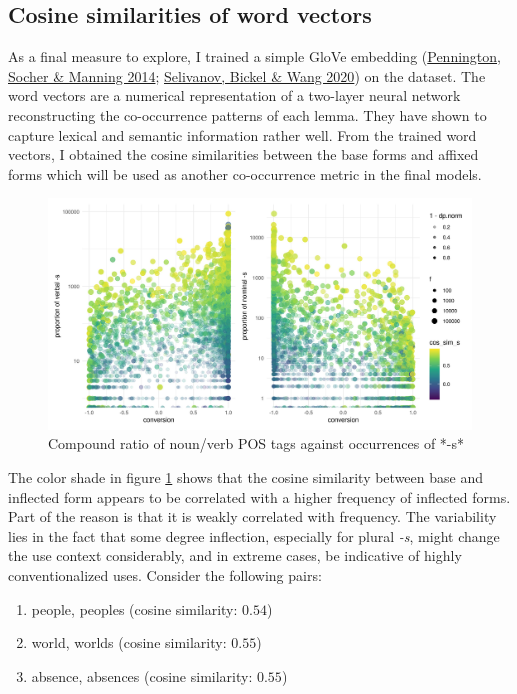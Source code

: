 \documentclass[
]{article}
\providecommand{\tightlist}{%
  \setlength{\itemsep}{0pt}\setlength{\parskip}{0pt}}
\begin{document}
\hypertarget{cosine-similarities-of-word-vectors}{%
\subsection{Cosine similarities of word
vectors}\label{cosine-similarities-of-word-vectors}}

As a final measure to explore, I trained a simple GloVe embedding
(\protect\hyperlink{ref-pennington14}{Pennington, Socher \& Manning
2014}; \protect\hyperlink{ref-text2vec}{Selivanov, Bickel \& Wang 2020})
on the dataset. The word vectors are a numerical representation of a
two-layer neural network reconstructing the co-occurrence patterns of
each lemma. They have shown to capture lexical and semantic information
rather well. From the trained word vectors, I obtained the cosine
similarities between the base forms and affixed forms which will be used
as another co-occurrence metric in the final models.

\begin{figure}[t!]
   \centering
   \includegraphics[width=\textwidth]{figures/s_continuum.jpg}
   \caption{Compound ratio of noun/verb POS tags against occurrences of *-s*}
   \label{s_continuum}
\end{figure}

The color shade in figure \ref{s_continuum} shows that the cosine
similarity between base and inflected form appears to be correlated with
a higher frequency of inflected forms. Part of the reason is that it is
weakly correlated with frequency. The variability lies in the fact that
some degree inflection, especially for plural \emph{-s}, might change
the use context considerably, and in extreme cases, be indicative of
highly conventionalized uses. Consider the following pairs:

\begin{enumerate}
\def\labelenumi{(\arabic{enumi})}
\setcounter{enumi}{4}
\tightlist
\item
  people, peoples (cosine similarity: \(0.54\))
\item
  world, worlds (cosine similarity: \(0.55\))
\item
  absence, absences (cosine similarity: \(0.55\))
\end{enumerate}
\end{document}
